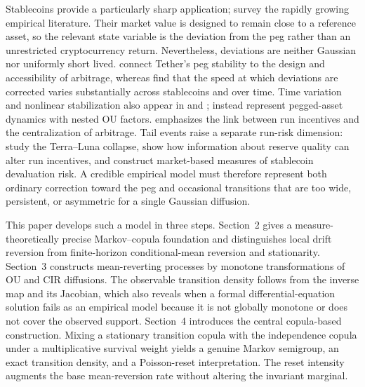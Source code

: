Stablecoins provide a particularly sharp application; \citet{AnteEtAl2023}
survey the rapidly growing empirical literature.  Their market value is
designed to remain close to a reference asset, so the relevant state variable
is the deviation from the peg rather than an unrestricted cryptocurrency
return.  Nevertheless, deviations are neither Gaussian nor uniformly short
lived.  \citet{LyonsViswanathNatraj2023} connect Tether's peg stability to the
design and accessibility of arbitrage, whereas \citet{DuanUrquhart2023} find
that the speed at which deviations are corrected varies substantially across
stablecoins and over time.  Time variation and nonlinear stabilization also
appear in \citet{DjogbenouInanJasiak2023} and
\citet{HuiWongLo2025}; \citet{BergaultEtAl2024} instead represent pegged-asset
dynamics with nested OU factors.  \citet{MaZengZhang2023} emphasizes the link
between run incentives and the centralization of arbitrage.  Tail events raise a separate run-risk dimension:
\citet{LiuMakarovSchoar2023} study the Terra--Luna collapse,
\citet{AhmedAldasoroDuley2025} show how information about reserve quality can
alter run incentives, and \citet{EichengreenNguyenViswanathNatraj2025}
construct market-based measures of stablecoin devaluation risk.  A credible
empirical model must therefore represent both ordinary correction toward the
peg and occasional transitions that are too wide, persistent, or asymmetric
for a single Gaussian diffusion.

This paper develops such a model in three steps.  Section~2 gives a
measure-theoretically precise Markov--copula foundation and distinguishes local
drift reversion from finite-horizon conditional-mean reversion and stationarity.
Section~3 constructs mean-reverting processes by monotone transformations of OU
and CIR diffusions.  The observable transition density follows from the inverse
map and its Jacobian, which also reveals when a formal differential-equation
solution fails as an empirical model because it is not globally monotone or
does not cover the observed support.  Section~4 introduces the central
copula-based construction.  Mixing a stationary transition copula with the
independence copula under a multiplicative survival weight yields a genuine
Markov semigroup, an exact transition density, and a Poisson-reset
interpretation.  The reset intensity augments the base mean-reversion rate
without altering the invariant marginal.

